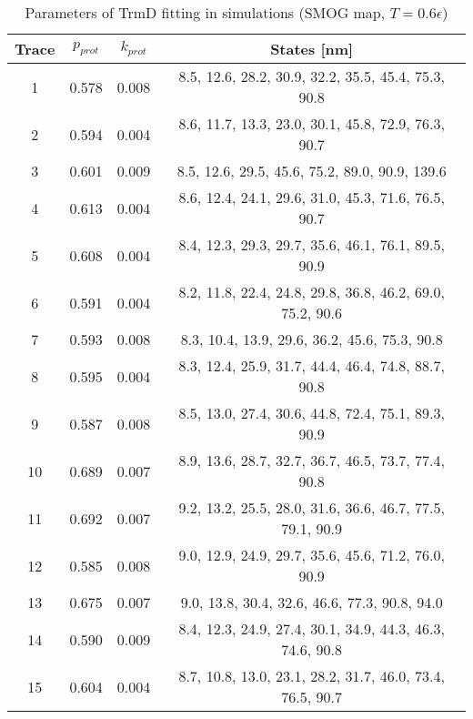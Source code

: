 \begin{table}
    \tiny
    \centering
    \caption{Parameters of TrmD fitting in simulations (SMOG map, $T=0.6\epsilon$)}
    \label{tab:trmd-sb-parameters}
    \begin{tabular}{c|c|c|c}
        \textbf{Trace} & \textbf{$p_{prot}$} & \textbf{$k_{prot}$} & \textbf{States [nm]}\\\hline
        1 & 0.578 & 0.008 & 8.5, 12.6, 28.2, 30.9, 32.2, 35.5, 45.4, 75.3, 90.8\\
        2 & 0.594 & 0.004 & 8.6, 11.7, 13.3, 23.0, 30.1, 45.8, 72.9, 76.3, 90.7\\
        3 & 0.601 & 0.009 & 8.5, 12.6, 29.5, 45.6, 75.2, 89.0, 90.9, 139.6\\
        4 & 0.613 & 0.004 & 8.6, 12.4, 24.1, 29.6, 31.0, 45.3, 71.6, 76.5, 90.7\\
        5 & 0.608 & 0.004 & 8.4, 12.3, 29.3, 29.7, 35.6, 46.1, 76.1, 89.5, 90.9\\
        6 & 0.591 & 0.004 & 8.2, 11.8, 22.4, 24.8, 29.8, 36.8, 46.2, 69.0, 75.2, 90.6\\
        7 & 0.593 & 0.008 & 8.3, 10.4, 13.9, 29.6, 36.2, 45.6, 75.3, 90.8\\
        8 & 0.595 & 0.004 & 8.3, 12.4, 25.9, 31.7, 44.4, 46.4, 74.8, 88.7, 90.8\\
        9 & 0.587 & 0.008 & 8.5, 13.0, 27.4, 30.6, 44.8, 72.4, 75.1, 89.3, 90.9\\
        10 & 0.689 & 0.007 & 8.9, 13.6, 28.7, 32.7, 36.7, 46.5, 73.7, 77.4, 90.8\\
        11 & 0.692 & 0.007 & 9.2, 13.2, 25.5, 28.0, 31.6, 36.6, 46.7, 77.5, 79.1, 90.9\\
        12 & 0.585 & 0.008 & 9.0, 12.9, 24.9, 29.7, 35.6, 45.6, 71.2, 76.0, 90.9\\
        13 & 0.675 & 0.007 & 9.0, 13.8, 30.4, 32.6, 46.6, 77.3, 90.8, 94.0\\
        14 & 0.590 & 0.009 & 8.4, 12.3, 24.9, 27.4, 30.1, 34.9, 44.3, 46.3, 74.6, 90.8\\
        15 & 0.604 & 0.004 & 8.7, 10.8, 13.0, 23.1, 28.2, 31.7, 46.0, 73.4, 76.5, 90.7\\\hline
    \end{tabular}
\end{table}

